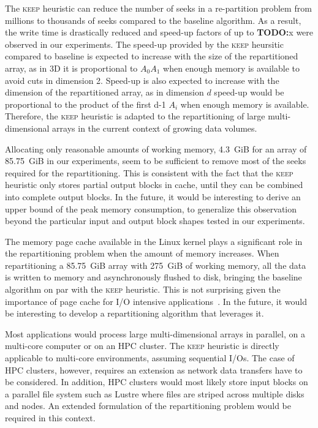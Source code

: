 \documentclass[sigconf, nonacm]{acmart}
\newcommand{\todo}[1]{\color{red}\textbf{TODO:}#1\color{black}}
\newcommand{\keep}[0]{\textsc{keep}\xspace}
\begin{document}
%
The \keep heuristic can reduce the number of seeks in a re-partition
problem from millions to thousands of seeks compared to the baseline
algorithm. As a result, the write time is drastically reduced and speed-up
factors of up to \todo{x} were observed in our experiments. The speed-up
provided by the \keep heursitic compared to baseline is expected to
increase with the size of the repartitioned array, as in 3D it is
proportional to $A_0$$A_1$ when enough memory is available to avoid cuts in
dimension 2. Speed-up is also expected to increase with the dimension of
the repartitioned array, as in dimension $d$ speed-up would be proportional
to the product of the first d-1 $A_i$ when enough memory is available.  
Therefore, the \keep heuristic is adapted to the repartitioning of large
multi-dimensional arrays in the current context of growing data volumes.

Allocating only reasonable amounts of working memory, 4.3~GiB for an array
of 85.75~GiB in our experiments, seem to be sufficient to remove most of
the seeks required for the repartitioning. This is consistent with the fact
that the \keep heuristic only stores partial output blocks in cache, until
they can be combined into complete output blocks. In the future, it would
be interesting to derive an upper bound of the peak memory consumption, to 
generalize this observation beyond the particular input and output block shapes 
tested in our experiments.

The memory page cache available in the Linux kernel plays a significant
role in the repartitioning problem when the amount of memory increases.
When repartitioning a 85.75~GiB array with 275~GiB of working memory, all
the data is written to memory and asynchronously flushed to disk, bringing
the baseline algorithm on par with the \keep heuristic. This is not
surprising given the importance of page cache for I/O intensive
applications~\cite{hayot2019performance}. In the future, it would be
interesting to develop a repartitioning algorithm that leverages it.

Most applications would process large multi-dimensional arrays in parallel,
on a multi-core computer or on an HPC cluster. The \keep heuristic is
directly applicable to multi-core environments, assuming sequential I/Os.
The case of HPC clusters, however, requires an extension as network data
transfers have to be considered. In addition, HPC clusters would most
likely store input blocks on a parallel file system such as Lustre where 
files are striped across multiple disks and nodes. An extended formulation of the 
repartitioning problem would be required in this context. 
\end{document}
